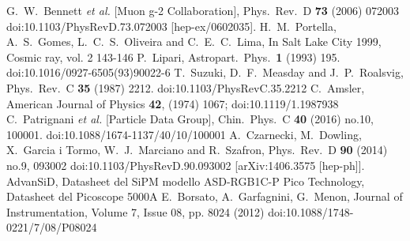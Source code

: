 \begin{thebibliography}{9}
G.~W.~Bennett {\it et al.} [Muon g-2 Collaboration],
Phys.\ Rev.\ D {\bf 73} (2006) 072003
doi:10.1103/PhysRevD.73.072003
[hep-ex/0602035].
H.~M.~Portella, A.~S.~Gomes, L.~C.~S.~Oliveira and C.~E.~C.~Lima,
In Salt Lake City 1999, Cosmic ray, vol. 2 143-146
P.~Lipari,
Astropart.\ Phys.\  {\bf 1} (1993) 195.
doi:10.1016/0927-6505(93)90022-6
T.~Suzuki, D.~F.~Measday and J.~P.~Roalsvig,
Phys.\ Rev.\ C {\bf 35} (1987) 2212.
doi:10.1103/PhysRevC.35.2212
C.~Amsler, 
American Journal of Physics {\bf 42}, (1974) 1067;  
doi:10.1119/1.1987938
C.~Patrignani {\it et al.} [Particle Data Group],
Chin.\ Phys.\ C {\bf 40} (2016) no.10,  100001.
doi:10.1088/1674-1137/40/10/100001
A.~Czarnecki, M.~Dowling, X.~Garcia i Tormo, W.~J.~Marciano and R.~Szafron,
Phys.\ Rev.\ D {\bf 90} (2014) no.9,  093002
doi:10.1103/PhysRevD.90.093002
[arXiv:1406.3575 [hep-ph]].
AdvanSiD,
Datasheet del SiPM modello ASD-RGB1C-P
Pico Technology,
Datasheet del Picoscope 5000A
E.~Borsato, A.~Garfagnini, G.~Menon,
Journal of Instrumentation, Volume 7, Issue 08, pp. 8024 (2012)
doi:10.1088/1748-0221/7/08/P08024
\end{thebibliography}
